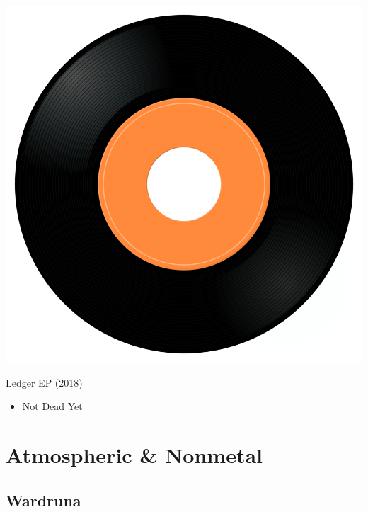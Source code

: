 \begin{minipage}[t]{0.25\textwidth}\vspace{0pt}
\captionsetup{type=figure}
\includegraphics[width=\textwidth]{Images/cover.png}
\caption*{Ledger EP (2018)}
\end{minipage}
\begin{minipage}[t]{0.25\textwidth}\vspace{0pt}
\begin{itemize}[nosep,leftmargin=1em,labelwidth=*,align=left]
	\setlength{\itemsep}{0pt}
	\item Not Dead Yet
\end{itemize}
\end{minipage}


\section{Atmospheric \& Nonmetal}

\subsection{Wardruna}

